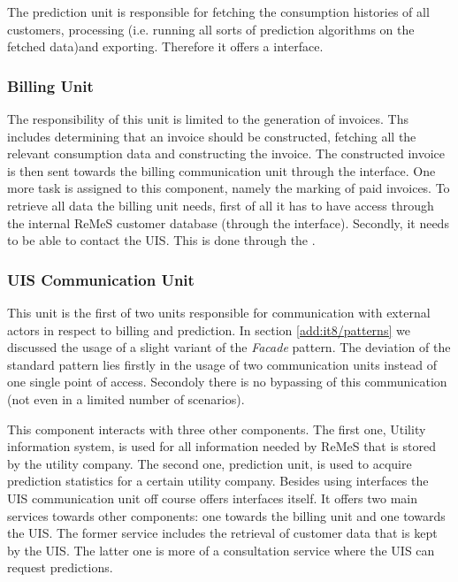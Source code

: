 \npar The prediction unit is responsible for fetching the consumption
histories of all customers, processing (i.e. running all sorts of
prediction algorithms on the fetched data)and exporting. Therefore it offers a
 interface.

\subsubsection{Billing Unit}

\npar The responsibility of this unit is limited to the generation of invoices.
Ths includes determining that an invoice should be constructed, fetching all the
relevant consumption data and constructing the invoice. The constructed invoice
is then sent towards the billing communication unit through the
 interface. One more task is assigned to this
component, namely the marking of paid invoices. To retrieve all data the
billing unit needs, first of all it has to have access through the internal
ReMeS customer database (through the  interface).
Secondly, it needs to be able to contact the UIS. This is done through the
.

\subsubsection{UIS Communication Unit}

\npar This unit is the first of two units responsible for communication with
external actors in respect to billing and prediction. In section
\ref{add:it8/patterns} we discussed the usage of a slight variant of the
\emph{Facade} pattern. The deviation of the standard pattern lies firstly in the
usage of two communication units instead of one single point of access.
Secondoly there is no bypassing of this communication (not even in a limited
number of scenarios).

\npar This component interacts with three other components. The first one,
Utility information system, is used for all information needed by ReMeS that is
stored by the utility company. The second one, prediction unit, is used to
acquire prediction statistics for a certain utility company. Besides using interfaces the UIS
communication unit off course offers interfaces itself. It offers two main
services towards other components: one towards the billing unit
and one towards the UIS. The former service includes the retrieval
of customer data that is kept by the UIS. The latter one is more of a
consultation service where the UIS can request predictions.

